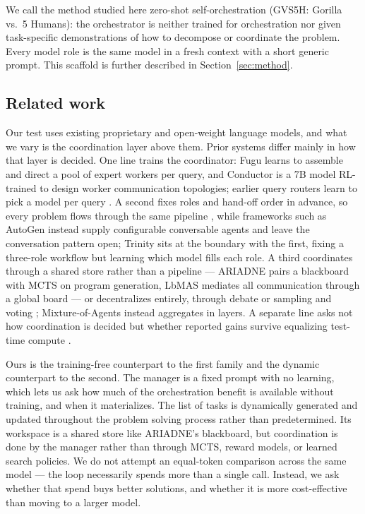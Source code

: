 \documentclass{article}
\begin{document}
We call the method studied here zero-shot self-orchestration (GVS5H: Gorilla vs.\ 5 Humans): the orchestrator is neither trained for orchestration nor
given task-specific demonstrations of how to decompose or coordinate the problem. Every model role is the same model in a fresh context
with a short generic prompt. This scaffold is further described in Section~\ref{sec:method}.

\subsection{Related work}
\label{sec:related}

Our test uses existing proprietary and open-weight language models, and what
we vary is the coordination layer above them. Prior systems differ mainly in how that layer is
decided. One line trains the coordinator: Fugu \citep{sakana2026} learns to assemble
and direct a pool of expert workers per query, and Conductor \citep{nielsen2025} is a 7B
model RL-trained to design worker communication topologies; earlier query routers learn to
pick a model per query \citep{ong2024}. A second fixes roles and hand-off order in advance,
so every problem flows through the same pipeline
\citep{hong2023,qian2023,li2023,huang2023,islam2024}, while frameworks such as AutoGen
\citep{wu2023} instead supply configurable conversable agents and leave the conversation
pattern open; Trinity \citep{xu2025} sits at the boundary with the first, fixing a
three-role workflow but learning which model fills each role. A third coordinates through a
shared store rather than a pipeline --- ARIADNE \citep{wei2026} pairs a blackboard with MCTS
on program generation, LbMAS \citep{han2025} mediates all communication through a global
board --- or decentralizes entirely, through debate \citep{du2023} or sampling and voting
\citep{li2024}; Mixture-of-Agents \citep{wangj2024a} instead aggregates in layers. A
separate line asks not how coordination is decided but whether reported gains survive
equalizing test-time compute \citep{wangj2024b,tran2026}.

Ours is the training-free counterpart to the first family and the dynamic counterpart to the
second. The manager is a fixed prompt with no learning, which lets us ask how much of the
orchestration benefit is available without training, and when it materializes. The list of tasks is dynamically generated and updated throughout the problem solving process rather than predetermined.
Its workspace is a shared store like ARIADNE's blackboard, but coordination is done by the manager
rather than through MCTS, reward models, or learned search policies. We do not attempt
an equal-token comparison across the same model --- the loop necessarily spends more than a single call. 
Instead, we ask whether that spend buys better solutions, and whether it is more cost-effective than moving to a larger model.
\end{document}
